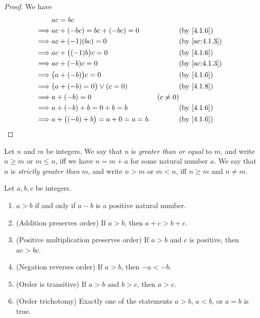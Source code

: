 \begin{proof}
  We have
  \begin{align*}
             & ac = bc                                                              \\
    \implies & ac + (-bc) = bc + (-bc) = 0             &            & \by{4.1.6}    \\
    \implies & ac + (-1)(bc) = 0                       &            & \by{ac:4.1.3} \\
    \implies & ac + \big((-1)b\big)c = 0               &            & \by{4.1.6}    \\
    \implies & ac + (-b)c = 0                          &            & \by{ac:4.1.3} \\
    \implies & \big(a + (-b)\big)c = 0                 &            & \by{4.1.6}    \\
    \implies & \big(a + (-b) = 0\big) \lor (c = 0)     &            & \by{4.1.8}    \\
    \implies & a + (-b) = 0                            & (c \neq 0)                 \\
    \implies & a + (-b) + b = 0 + b = b                &            & \by{4.1.6}    \\
    \implies & a + \big((-b) + b\big) = a + 0 = a = b. &            & \by{4.1.6}
  \end{align*}
\end{proof}

\begin{defn}\label{4.1.10}
  Let \(n\) and \(m\) be integers.
  We say that \(n\) is \emph{greater than or equal} to \(m\), and write \(n \geq m\) or \(m \leq n\), iff we have \(n = m + a\) for some natural number \(a\).
  We say that \(n\) is \emph{strictly greater than} \(m\), and write \(n > m\) or \(m < n\), iff \(n \geq m\) and \(n \neq m\).
\end{defn}

\begin{lem}\label{4.1.11}
  Let \(a, b, c\) be integers.
  \begin{enumerate}
    \item \(a > b\) if and only if \(a - b\) is a positive natural number.
    \item (Addition preserves order) If \(a > b\), then \(a + c > b + c\).
    \item (Positive multiplication preserves order) If \(a > b\) and \(c\) is positive, then \(ac > bc\).
    \item (Negation reverses order) If \(a > b\), then \(-a < -b\).
    \item (Order is transitive) If \(a > b\) and \(b > c\), then \(a > c\).
    \item (Order trichotomy) Exactly one of the statements \(a > b\), \(a < b\), or \(a = b\) is true.
  \end{enumerate}
\end{lem}

